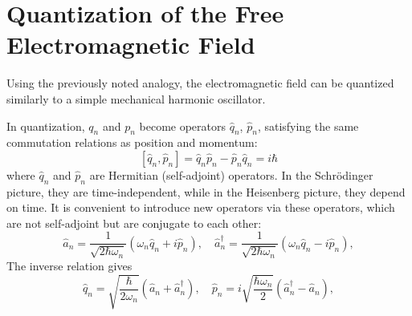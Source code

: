 \section{Quantization of the Free Electromagnetic Field}
\label{Ch1_quantumemf}
Using the previously noted analogy, the electromagnetic field can be quantized similarly to a simple mechanical harmonic oscillator.

In quantization, $q_n$ and $p_n$ become operators $\hat{q}_n$,
$\hat{p}_n$, satisfying the same commutation relations as position and momentum:
\begin{equation}
\left[\hat{q}_n, \hat{p}_n\right] = \hat{q}_n\hat{p}_n -
\hat{p}_n \hat{q}_n = i\hbar
\label{eqCh1_comut}
\end{equation}
where $\hat{q}_n$ and $\hat{p}_n$ are Hermitian (self-adjoint) operators. In the Schrödinger picture, they are time-independent, while in the Heisenberg picture, they depend on time. It is convenient to introduce new operators via these operators, which are not self-adjoint but are conjugate to each other:
\begin{equation}
\hat{a}_n = \frac{1}{\sqrt{2 \hbar \omega_n}}
\left( \omega_n \hat{q}_n + i \hat{p}_n\right),
\quad
\hat{a}_n^{\dag} = \frac{1}{\sqrt{2 \hbar \omega_n}}
\left( \omega_n \hat{q}_n - i \hat{p}_n\right),
\label{eqCh1_aadef}
\end{equation}
The inverse relation gives
\begin{equation}
\hat{q}_n = \sqrt{\frac{\hbar}{2 \omega_n}}
\left(\hat{a}_n + \hat{a}_n^{\dag}\right),
\quad
\hat{p}_n = i \sqrt{\frac{\hbar \omega_n}{2}}
\left(\hat{a}_n^{\dag} - \hat{a}_n\right),
\label{eqCh1_qpdef}
\end{equation}

